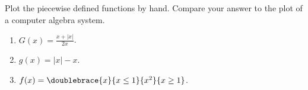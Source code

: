 Plot the piecewise defined functions by hand. Compare your answer to the plot of a computer algebra system.
\begin{multicols}{2}
\begin{enumerate}
\item $G(x)=\frac{x+|x|}{2x}$.
\item $g(x)=|x|-x$.
\item $f(x)=\doublebrace{x}{x\leq 1}{x^2}{x\geq 1}$.
\end{enumerate}
\end{multicols}
